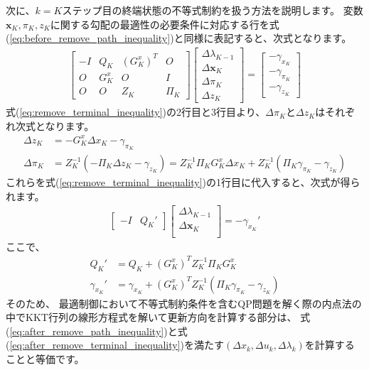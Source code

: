 \documentclass[a4paper]{jarticle}
\begin{document}
次に、$k=K$ステップ目の終端状態の不等式制約を扱う方法を説明します。
変数$\mathbf{x}_K,\pi_K,z_K$に関する勾配の最適性の必要条件に対応する行を式(\ref{eq:before_remove_path_inequality})と同様に表記すると、次式となります。
\begin{align}
\begin{bmatrix}
 -I & Q_{K} & (G_K^x)^T    & O \\
 O & G_K^x &  O& I\\
 O & O & Z_K & \Pi_K
\end{bmatrix}
\begin{bmatrix}
\Delta \lambda_{K-1}\\
\Delta \mathbf{x}_K\\
\Delta \pi_K\\
\Delta z_K
\end{bmatrix}
=
\begin{bmatrix}
-\gamma_{x_K}\\
-\gamma_{\pi_K}\\
-\gamma_{z_K}
\end{bmatrix}
\label{eq:remove_terminal_inequality}
\end{align}
式(\ref{eq:remove_terminal_inequality})の2行目と3行目より、$\Delta \pi_K$と$\Delta z_K$はそれぞれ次式となります。
\begin{align*}
\Delta z_K &= -G_K^x\Delta x_K-\gamma_{\pi_K}
\\
\Delta \pi_K &= Z_K^{-1}(-\Pi_K\Delta z_K -\gamma_{z_K})
= Z_K^{-1}\Pi_KG_K^x\Delta x_K
+Z_K^{-1}(\Pi_K\gamma_{\pi_K} - \gamma_{z_K})
\end{align*}
これらを式(\ref{eq:remove_terminal_inequality})の1行目に代入すると、次式が得られます。
\begin{align}
\begin{bmatrix}
-I & Q_K'
\end{bmatrix}
\begin{bmatrix}
\Delta \lambda_{K-1}\\
\Delta \mathbf{x}_K\\
\end{bmatrix}
=
-\gamma_{x_K}'
\label{eq:after_remove_terminal_inequality}
\end{align}
ここで、
\begin{align*}
 Q_K' &= Q_K +(G_K^x)^TZ_{K}^{-1}\Pi_KG_K^x
 \\
 \gamma_{x_K}' &= \gamma_{x_K} + (G_K^x)^TZ_K^{-1}(\Pi_K\gamma_{\pi_K}-\gamma_{z_K})
\end{align*}
そのため、
最適制御において不等式制約条件を含むQP問題を解く際の内点法の中でKKT行列の線形方程式を解いて更新方向を計算する部分は、
式(\ref{eq:after_remove_path_inequality})と式(\ref{eq:after_remove_terminal_inequality})を満たす$(\Delta x_k,\Delta u_k,\Delta \lambda_k)$を計算することと等価です。
\end{document}
